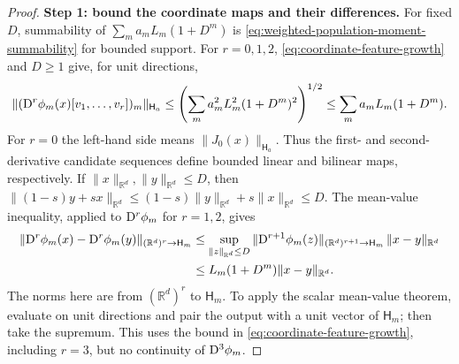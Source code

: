 \begin{proof}
\noindent\textbf{Step 1: bound the coordinate maps and their differences.}
For fixed $D$, summability of
$\sum_m a_mL_m(1+D^m)$ is
\eqref{eq:weighted-population-moment-summability} for bounded support.
For $r=0,1,2$, \eqref{eq:coordinate-feature-growth} and $D\ge1$ give, for unit directions,
\[
 \|(\mathrm{D}^r\phi_m(x)[v_1,\ldots,v_r])_m\|_{\mathsf H_a}
 \le\left(\sum_m a_m^2L_m^2(1+D^m)^2\right)^{1/2}
 \le\sum_m a_mL_m(1+D^m).
\]
For $r=0$ the left-hand side means $\|J_0(x)\|_{\mathsf H_a}$.
Thus the first- and second-derivative candidate sequences define bounded
linear and bilinear maps, respectively.
If $\|x\|_{\mathbb R^d},\|y\|_{\mathbb R^d}\le D$, then
$\|(1-s)y+sx\|_{\mathbb R^d}\le(1-s)\|y\|_{\mathbb R^d}+s\|x\|_{\mathbb R^d}\le D$.
The mean-value inequality, applied to $\mathrm{D}^r\phi_m$ for $r=1,2$, gives
\begin{equation}
\label{eq:coordinate-feature-spatial-difference}
\begin{aligned}
 \|\mathrm{D}^r\phi_m(x)-\mathrm{D}^r\phi_m(y)\|_{(\mathbb R^d)^r\to\mathsf H_m}
 &\le\sup_{\|z\|_{\mathbb R^d}\le D}\|\mathrm{D}^{r+1}\phi_m(z)\|_{(\mathbb R^d)^{r+1}\to\mathsf H_m}\,\|x-y\|_{\mathbb R^d}
 \\ &\le L_m(1+D^m)\|x-y\|_{\mathbb R^d}.
\end{aligned}
\end{equation}
The norms here are from $(\mathbb R^d)^r$ to $\mathsf H_m$.
To apply the scalar mean-value theorem, evaluate on unit directions
and pair the output with a unit vector of $\mathsf H_m$; then take the
supremum. This uses the bound in \eqref{eq:coordinate-feature-growth},
including $r=3$, but no continuity of $\mathrm{D}^3\phi_m$.


\end{proof}
